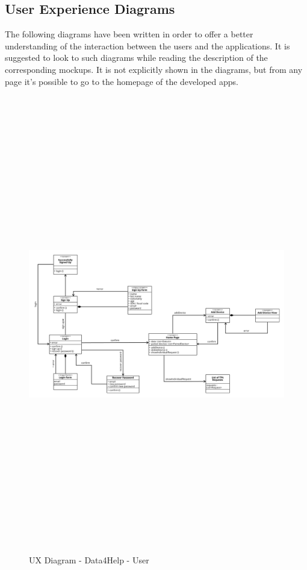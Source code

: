 \newpage
{\color{secblue}\subsection{User Experience Diagrams}}
The following diagrams have been written in order to offer a better understanding of the interaction between the users and the applications. 
It is suggested to look to such diagrams while reading the description of the corresponding mockups.
It is not explicitly shown in the diagrams, but from any page it's possible to go to the homepage of the developed apps.

\begin{figure}[H]
    \includegraphics[width=\linewidth, height = 20cm, keepaspectratio]{./Images/DD_UXD_D4H_U.png}
    \centering
    \caption{UX Diagram - Data4Help - User}
    \label{fig:sab}
 \end{figure}

